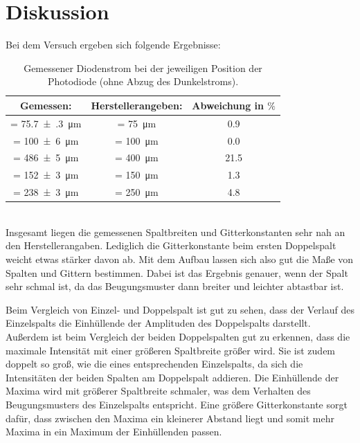 \documentclass[
  bibliography=totoc,     %
  captions=tableheading,  %
  titlepage=firstiscover, %
]{scrartcl}
\begin{document}
\section{Diskussion}
\label{sec:diskussion}
Bei dem Versuch ergeben sich folgende Ergebnisse:
\begin{table}
  \centering
  \caption{Gemessener Diodenstrom bei der jeweiligen Position der Photodiode (ohne Abzug des Dunkelstroms).}
  \label{tab:messwerte1}
  \begin{tabular}{S S[table-format=3.0] S[table-format=2.1]}
    \toprule
    {Gemessen:} & {Herstellerangeben:} & {Abweichung in $\si{\percent}$} \\
    \midrule
     = \SI{75.7(3)}{\micro\meter} &  = \SI{75}{\micro\meter} & 0.9\\
     = \SI{100(6)}{\micro\meter} &  = \SI{100}{\micro\meter} & 0.0\\
     = \SI{486(5)}{\micro\meter} &  = \SI{400}{\micro\meter} & 21.5\\
     = \SI{152(3)}{\micro\meter} &  = \SI{150}{\micro\meter} & 1.3\\
     = \SI{238(3)}{\micro\meter} &  = \SI{250}{\micro\meter} & 4.8\\
    \bottomrule
  \end{tabular}
\end{table}\\
Insgesamt liegen die gemessenen Spaltbreiten und Gitterkonstanten sehr nah an
den Herstellerangaben. Lediglich die Gitterkonstante beim ersten Doppelspalt
weicht etwas stärker davon ab. Mit dem Aufbau lassen sich also gut die Maße
von Spalten und Gittern bestimmen. Dabei ist das Ergebnis genauer, wenn der
Spalt sehr schmal ist, da das Beugungsmuster dann breiter und leichter
abtastbar ist.

\noindent
Beim Vergleich von Einzel- und Doppelspalt ist gut zu sehen,
dass der Verlauf des Einzelspalts die Einhüllende der Amplituden des
Doppelspalts darstellt. Außerdem ist beim Vergleich der beiden Doppelspalten
gut zu erkennen, dass die maximale Intensität mit einer größeren Spaltbreite
größer wird. Sie ist zudem doppelt so groß, wie die eines entsprechenden
Einzelspalts, da sich die Intensitäten der beiden Spalten am Doppelspalt
addieren. Die Einhüllende der Maxima wird mit größerer Spaltbreite schmaler,
was dem Verhalten des Beugungsmusters des Einzelspalts entspricht.
Eine größere Gitterkonstante sorgt dafür, dass zwischen den Maxima ein kleinerer
Abstand liegt und somit mehr Maxima in ein Maximum der Einhüllenden passen.
\nocite{*}
\printbibliography
\end{document}
